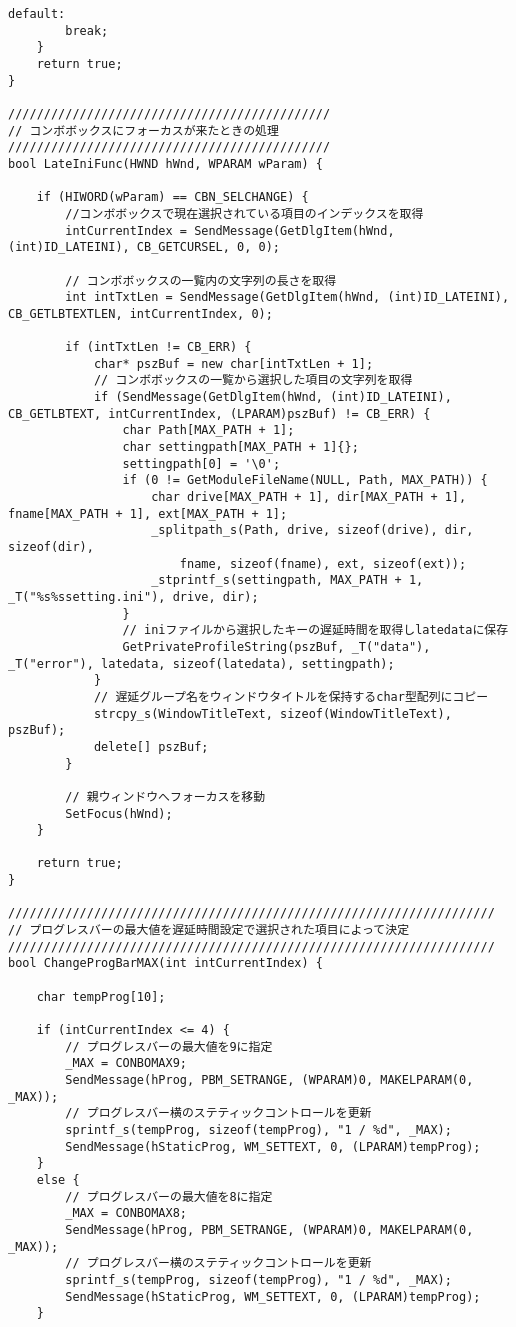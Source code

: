 \begin{lstlisting}[caption=main.cpp]
	default:
		break;
	}
	return true;
}

/////////////////////////////////////////////
// コンボボックスにフォーカスが来たときの処理
/////////////////////////////////////////////
bool LateIniFunc(HWND hWnd, WPARAM wParam) {

	if (HIWORD(wParam) == CBN_SELCHANGE) {
		//コンボボックスで現在選択されている項目のインデックスを取得
		intCurrentIndex = SendMessage(GetDlgItem(hWnd, (int)ID_LATEINI), CB_GETCURSEL, 0, 0);
		
		// コンボボックスの一覧内の文字列の長さを取得
		int intTxtLen = SendMessage(GetDlgItem(hWnd, (int)ID_LATEINI), CB_GETLBTEXTLEN, intCurrentIndex, 0);

		if (intTxtLen != CB_ERR) {
			char* pszBuf = new char[intTxtLen + 1];
			// コンボボックスの一覧から選択した項目の文字列を取得
			if (SendMessage(GetDlgItem(hWnd, (int)ID_LATEINI), CB_GETLBTEXT, intCurrentIndex, (LPARAM)pszBuf) != CB_ERR) {
				char Path[MAX_PATH + 1];
				char settingpath[MAX_PATH + 1]{};
				settingpath[0] = '\0';
				if (0 != GetModuleFileName(NULL, Path, MAX_PATH)) {
					char drive[MAX_PATH + 1], dir[MAX_PATH + 1], fname[MAX_PATH + 1], ext[MAX_PATH + 1];
					_splitpath_s(Path, drive, sizeof(drive), dir, sizeof(dir),
						fname, sizeof(fname), ext, sizeof(ext));
					_stprintf_s(settingpath, MAX_PATH + 1, _T("%s%ssetting.ini"), drive, dir);
				}
				// iniファイルから選択したキーの遅延時間を取得しlatedataに保存
				GetPrivateProfileString(pszBuf, _T("data"), _T("error"), latedata, sizeof(latedata), settingpath);
			}
			// 遅延グループ名をウィンドウタイトルを保持するchar型配列にコピー
			strcpy_s(WindowTitleText, sizeof(WindowTitleText), pszBuf);
			delete[] pszBuf;
		}

		// 親ウィンドウへフォーカスを移動
		SetFocus(hWnd);
	}
	
	return true;
}

////////////////////////////////////////////////////////////////////
// プログレスバーの最大値を遅延時間設定で選択された項目によって決定
////////////////////////////////////////////////////////////////////
bool ChangeProgBarMAX(int intCurrentIndex) {

	char tempProg[10];

	if (intCurrentIndex <= 4) {
		// プログレスバーの最大値を9に指定
		_MAX = CONBOMAX9;
		SendMessage(hProg, PBM_SETRANGE, (WPARAM)0, MAKELPARAM(0, _MAX));
		// プログレスバー横のステティックコントロールを更新
		sprintf_s(tempProg, sizeof(tempProg), "1 / %d", _MAX);
		SendMessage(hStaticProg, WM_SETTEXT, 0, (LPARAM)tempProg);
	}
	else {
		// プログレスバーの最大値を8に指定
		_MAX = CONBOMAX8;
		SendMessage(hProg, PBM_SETRANGE, (WPARAM)0, MAKELPARAM(0, _MAX));
		// プログレスバー横のステティックコントロールを更新
		sprintf_s(tempProg, sizeof(tempProg), "1 / %d", _MAX);
		SendMessage(hStaticProg, WM_SETTEXT, 0, (LPARAM)tempProg);
	}


\end{lstlisting}
